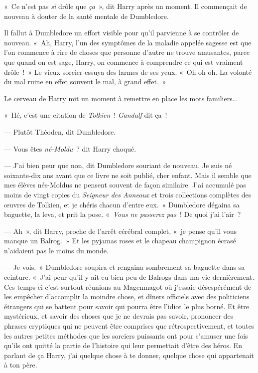 «~Ce n'est pas \emph{si} drôle que \emph{ça}~», dit Harry après un moment.
Il commençait de nouveau à douter de la santé mentale de Dumbledore.

Il fallut à Dumbledore un effort visible pour qu'il parvienne à se contrôler de nouveau.
«~Ah, Harry, l'un des symptômes de la maladie appelée sagesse est que l'on commence à rire de choses que personne d'autre ne trouve amusantes, parce que quand on est sage, Harry, on commence à comprendre ce qui est vraiment drôle~!~»
Le vieux sorcier essuya des larmes de ses yeux.
«~Oh oh oh.
La volonté du mal ruine en effet souvent le mal, à grand effet.~»

Le cerveau de Harry mit un moment à remettre en place les mots familiers…

«~Hé, c'est une citation de \emph{Tolkien}~!
\emph{Gandalf} dit ça~!

--- Plutôt Théoden, dit Dumbledore.

--- Vous êtes \emph{né-Moldu}~? dit Harry choqué.

--- J'ai bien peur que non, dit Dumbledore souriant de nouveau.
Je suis né soixante-dix ans avant que ce livre ne soit publié, cher enfant.
Mais il semble que mes élèves nés-Moldus ne pensent souvent de façon similaire.
J'ai accumulé pas moins de vingt copies du \emph{Seigneur des Anneaux} et trois collections complètes des œuvres de Tolkien, et je chéris chacun d'entre eux.~»
Dumbledore dégaina sa baguette, la leva, et prit la pose.
«~\emph{Vous ne passerez pas}~!
De quoi j'ai l'air~?

--- Ah~», dit Harry, proche de l'arrêt cérébral complet, «~je pense qu'il vous manque un Balrog.~»
Et les pyjamas roses et le chapeau champignon écrasé n'aidaient pas le moins du monde.

--- Je vois.~»
Dumbledore soupira et rengaina sombrement sa baguette dans sa ceinture.
«~J'ai peur qu'il y ait eu bien peu de Balrogs dans ma vie dernièrement.
Ces temps-ci c'est surtout réunions au Magenmagot où j'essaie désespérément de les empêcher d'accomplir la moindre chose, et dîners officiels avec des politiciens étrangers qui se battent pour savoir qui pourra être l'idiot le plus borné.
Et être mystérieux, et savoir des choses que je ne devrais pas savoir, prononcer des phrases cryptiques qui ne peuvent être comprises que rétrospectivement, et toutes les autres petites méthodes que les sorciers puissants ont pour s'amuser une fois qu'ils ont quitté la partie de l'histoire qui leur permettait d'être des héros.
En parlant de ça Harry, j'ai quelque chose à te donner, quelque chose qui appartenait à ton père.

